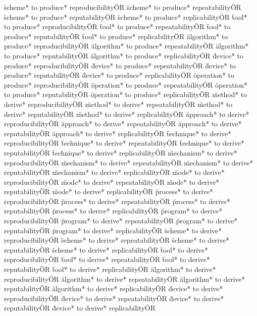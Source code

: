 \documentclass[
10pt, %
a4paper, %
oneside, %
headinclude,footinclude, %
BCOR5mm, %
]{scrartcl}
\begin{document}
\"scheme* to produce* reproducibility\" OR \"scheme* to produce* repeatability\" OR \"scheme* to produce* reputability\" OR \"scheme* to produce* replicability\" OR 
\"tool* to produce* reproducibility\" OR \"tool* to produce* repeatability\" OR \"tool* to produce* reputability\" OR \"tool* to produce* replicability\" OR 
\"algorithm* to produce* reproducibility\" OR \"algorithm* to produce* repeatability\" OR \"algorithm* to produce* reputability\" OR \"algorithm* to produce* replicability\" OR 
\"device* to produce* reproducibility\" OR \"device* to produce* repeatability\" OR \"device* to produce* reputability\" OR \"device* to produce* replicability\" OR 
\"operation* to produce* reproducibility\" OR \"operation* to produce* repeatability\" OR \"operation* to produce* reputability\" OR \"operation* to produce* replicability\" OR 
\"method* to derive* reproducibility\" OR \"method* to derive* repeatability\" OR \"method* to derive* reputability\" OR \"method* to derive* replicability\" OR 
\"approach* to derive* reproducibility\" OR \"approach* to derive* repeatability\" OR \"approach* to derive* reputability\" OR \"approach* to derive* replicability\" OR 
\"technique* to derive* reproducibility\" OR \"technique* to derive* repeatability\" OR \"technique* to derive* reputability\" OR \"technique* to derive* replicability\" OR 
\"mechanism* to derive* reproducibility\" OR \"mechanism* to derive* repeatability\" OR \"mechanism* to derive* reputability\" OR \"mechanism* to derive* replicability\" OR 
\"mode* to derive* reproducibility\" OR \"mode* to derive* repeatability\" OR \"mode* to derive* reputability\" OR \"mode* to derive* replicability\" OR 
\"process* to derive* reproducibility\" OR \"process* to derive* repeatability\" OR \"process* to derive* reputability\" OR \"process* to derive* replicability\" OR 
\"program* to derive* reproducibility\" OR \"program* to derive* repeatability\" OR \"program* to derive* reputability\" OR \"program* to derive* replicability\" OR 
\"scheme* to derive* reproducibility\" OR \"scheme* to derive* repeatability\" OR \"scheme* to derive* reputability\" OR \"scheme* to derive* replicability\" OR 
\"tool* to derive* reproducibility\" OR \"tool* to derive* repeatability\" OR \"tool* to derive* reputability\" OR \"tool* to derive* replicability\" OR 
\"algorithm* to derive* reproducibility\" OR \"algorithm* to derive* repeatability\" OR \"algorithm* to derive* reputability\" OR \"algorithm* to derive* replicability\" OR 
\"device* to derive* reproducibility\" OR \"device* to derive* repeatability\" OR \"device* to derive* reputability\" OR \"device* to derive* replicability\" OR 
\end{document}
